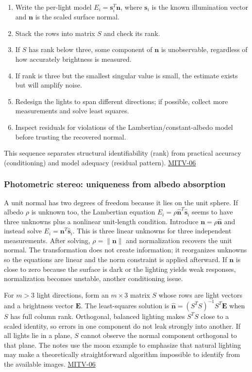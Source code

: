 \begin{enumerate}
\def\labelenumi{\arabic{enumi}.}
\tightlist
\item
  Write the per-light model \(E_i=\mathbf{s}_i^T\mathbf{n}\), where \(\mathbf{s}_i\) is the known illumination vector and \(\mathbf{n}\) is the scaled surface normal.
\item
  Stack the rows into matrix \(S\) and check its rank.
\item
  If \(S\) has rank below three, some component of \(\mathbf{n}\) is unobservable, regardless of how accurately brightness is measured.
\item
  If rank is three but the smallest singular value is small, the estimate exists but will amplify noise.
\item
  Redesign the lights to span different directions; if possible, collect more measurements and solve least squares.
\item
  Inspect residuals for violations of the Lambertian/constant-albedo model before trusting the recovered normal.
\end{enumerate}

This sequence separates structural identifiability (rank) from practical accuracy (conditioning) and model adequacy (residual pattern). \hyperref[04-visual-computing-ii-ch036]{MITV-06}

\subsubsection{Photometric stereo: uniqueness from albedo absorption}\label{photometric-stereo-uniqueness-from-albedo-absorption}

A unit normal has two degrees of freedom because it lies on the unit sphere. If albedo \(\rho\) is unknown too, the Lambertian equation \(E_i=\rho\hat{\mathbf n}^T\hat{\mathbf s}_i\) seems to have three unknowns plus a nonlinear unit-length condition. Introduce \(\mathbf n=\rho\hat{\mathbf n}\) and instead solve \(E_i=\mathbf n^T\hat{\mathbf s}_i\). This is three linear unknowns for three independent measurements. After solving, \(\rho=\|\mathbf n\|\) and normalization recovers the unit normal. The transformation does not create information; it reorganizes unknowns so the equations are linear and the norm constraint is applied afterward. If \(\mathbf n\) is close to zero because the surface is dark or the lighting yields weak responses, normalization becomes unstable, another conditioning issue.

For \(m>3\) light directions, form an \(m\times3\) matrix \(S\) whose rows are light vectors and a brightness vector \(\mathbf E\). The least-squares solution is \(\hat{\mathbf n}=(S^TS)^{-1}S^T\mathbf E\) when \(S\) has full column rank. Orthogonal, balanced lighting makes \(S^TS\) close to a scaled identity, so errors in one component do not leak strongly into another. If all lights lie in a plane, \(S\) cannot observe the normal component orthogonal to that plane. The notes use the moon example to emphasize that natural lighting may make a theoretically straightforward algorithm impossible to identify from the available images. \hyperref[04-visual-computing-ii-ch036]{MITV-06}

